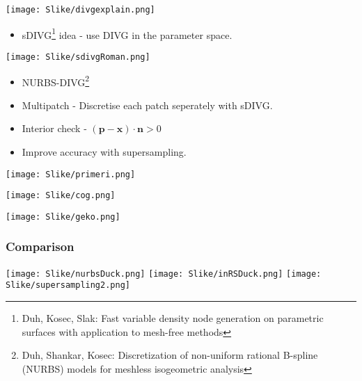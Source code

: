 \documentclass{beamer}
\begin{document}
\begin{frame}
\texttt{[image: Slike/divgexplain.png]}
\end{frame}
\begin{frame}
\begin{itemize}
\item<1-> sDIVG\footnote{Duh, Kosec, Slak: Fast variable density node generation on parametric surfaces with application to mesh-free methods} idea - use DIVG in the parameter space.
\end{itemize}
\end{frame}
\begin{frame}
\texttt{[image: Slike/sdivgRoman.png]}
\end{frame}
\begin{frame}
\begin{itemize}
\item<1-> NURBS-DIVG\footnote{Duh, Shankar, Kosec: Discretization of non-uniform rational B-spline (NURBS) models for meshless isogeometric analysis}
\item<2-> Multipatch - Discretise each patch seperately with sDIVG.
\end{itemize}
\end{frame}
\begin{frame}
\begin{itemize}
\item<1-> Interior check - $(\textbf{p}-\textbf{x})\cdot \textbf{n} > 0$
\item<3-> Improve accuracy with supersampling.
\end{itemize}
\end{frame}
\begin{frame}
\texttt{[image: Slike/primeri.png]}
\end{frame}
\begin{frame}
\texttt{[image: Slike/cog.png]}
\end{frame}
\begin{frame}
\texttt{[image: Slike/geko.png]}
\end{frame}
\begin{frame}
\frametitle{Comparison}
\texttt{[image: Slike/nurbsDuck.png]}
\texttt{[image: Slike/inRSDuck.png]}
\texttt{[image: Slike/supersampling2.png]}
\end{frame}
\end{document}
